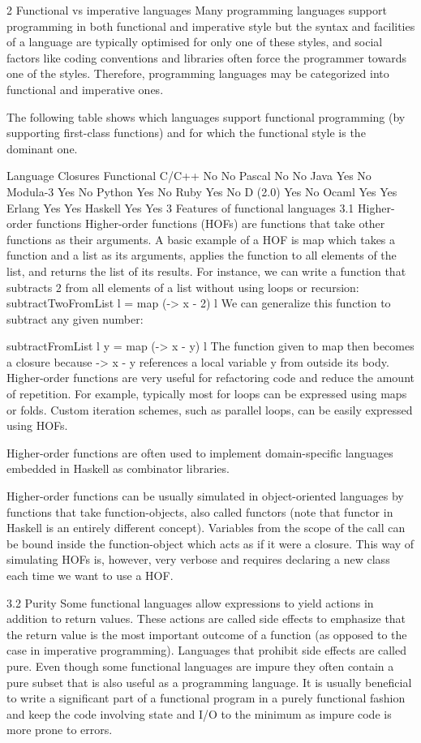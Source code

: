 \documentclass{report}
\begin{document}
2 Functional vs imperative languages
Many programming languages support programming in both functional and imperative style but the syntax and facilities of a language are typically optimised for only one of these styles, and social factors like coding conventions and libraries often force the programmer towards one of the styles. Therefore, programming languages may be categorized into functional and imperative ones.

The following table shows which languages support functional programming (by supporting first-class functions) and for which the functional style is the dominant one.

Language	 Closures	 Functional
C/C++	 No	 No
Pascal	 No	 No
Java	 Yes	 No
Modula-3	 Yes	 No
Python	 Yes	 No
Ruby	 Yes	 No
D (2.0)	 Yes	 No
Ocaml	 Yes	 Yes
Erlang	 Yes	 Yes
Haskell	 Yes	 Yes
3 Features of functional languages
3.1 Higher-order functions
Higher-order functions (HOFs) are functions that take other functions as their arguments. A basic example of a HOF is map which takes a function and a list as its arguments, applies the function to all elements of the list, and returns the list of its results. For instance, we can write a function that subtracts 2 from all elements of a list without using loops or recursion:
subtractTwoFromList l = map (\x -> x - 2) l
We can generalize this function to subtract any given number:

subtractFromList l y = map (\x -> x - y) l
The function given to map then becomes a closure because \x -> x - y references a local variable y from outside its body.
Higher-order functions are very useful for refactoring code and reduce the amount of repetition. For example, typically most for loops can be expressed using maps or folds. Custom iteration schemes, such as parallel loops, can be easily expressed using HOFs.

Higher-order functions are often used to implement domain-specific languages embedded in Haskell as combinator libraries.

Higher-order functions can be usually simulated in object-oriented languages by functions that take function-objects, also called functors (note that functor in Haskell is an entirely different concept). Variables from the scope of the call can be bound inside the function-object which acts as if it were a closure. This way of simulating HOFs is, however, very verbose and requires declaring a new class each time we want to use a HOF.

3.2 Purity
Some functional languages allow expressions to yield actions in addition to return values. These actions are called side effects to emphasize that the return value is the most important outcome of a function (as opposed to the case in imperative programming). Languages that prohibit side effects are called pure. Even though some functional languages are impure they often contain a pure subset that is also useful as a programming language. It is usually beneficial to write a significant part of a functional program in a purely functional fashion and keep the code involving state and I/O to the minimum as impure code is more prone to errors.
\end{document}
